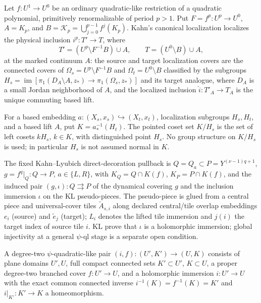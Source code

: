 \begin{definition}\label{def:canonical-localization}
Let \(f:U^1\to U^0\) be an ordinary quadratic-like restriction of a quadratic
polynomial, primitively renormalizable of period \(p>1\). Put
\(F=f^p:U^p\to U^0\), \(A=K_p\), and \(B=\mathcal K_p=\bigcup_{j=0}^{p-1}f^j(K_p)\).
Kahn's canonical localization localizes the physical inclusion
\(i^p:T'\to T\), where
\[
T'=(U^p\setminus F^{-1}B)\cup A,\qquad T=(U^0\setminus B)\cup A,
\]
at the marked continuum \(A\): the source and target localization covers are the
connected covers of \(\Omega_s=U^p\setminus F^{-1}B\) and \(\Omega_t=U^0\setminus B\)
classified by the subgroups
\(H_s=\operatorname{im}[\pi_1(D_A\setminus A,z_*)\to\pi_1(\Omega_s,z_*)]\)
and its target analogue, where \(D_A\) is a small Jordan neighborhood of \(A\),
and the localized inclusion \(\hat i:T'_A\to T_A\) is the unique commuting based lift.
\end{definition}

\begin{definition}\label{def:pointed-coset}
For a based embedding \(a:(X_s,x_s)\hookrightarrow(X_t,x_t)\), localization
subgroups \(H_s,H_t\), and a based lift \(A\), put \(K=a_*^{-1}(H_t)\).
The pointed coset set \(K/H_s\) is the set of left cosets \(kH_s\), \(k\in K\),
with distinguished point \(H_s\). No group structure on \(K/H_s\) is used;
in particular \(H_s\) is not assumed normal in \(K\).
\end{definition}

\begin{definition}\label{def:direct-decoration}
The fixed Kahn--Lyubich direct-decoration pullback is
\(Q=Q_a\subset P=Y^{(\nu-1)q+1}\), \(g=f^q|_Q:Q\to P\), \(a\in\{L,R\}\),
with \(K_Q=Q\cap K(f)\), \(K_P=P\cap K(f)\), and the induced pair
\((g,\iota):Q\rightrightarrows P\) of the dynamical covering \(g\) and the
inclusion immersion \(\iota\) on the KL pseudo-pieces. The pseudo-piece is
glued from a central piece and universal-cover tiles \(\tilde A_{s,i}\) along
declared central/tile overlap embeddings \(e_i\) (source) and \(\tilde e_j\)
(target); \(L_i\) denotes the lifted tile immersion and \(j(i)\) the target
index of source tile \(i\). KL prove that \(\iota\) is a holomorphic immersion;
global injectivity at a general \(\psi\)-ql stage is a separate open condition.
\end{definition}

\begin{definition}\label{def:psi-ql}
A degree-two \(\psi\)-quadratic-like pair \((i,f):(U',K')\to(U,K)\) consists of
plane domains \(U',U\), full compact connected sets \(K'\subset U'\), \(K\subset U\),
a proper degree-two branched cover \(f:U'\to U\), and a holomorphic immersion
\(i:U'\to U\) with the exact common connected inverse
\(i^{-1}(K)=f^{-1}(K)=K'\) and \(i|_{K'}:K'\to K\) a homeomorphism.
\end{definition}